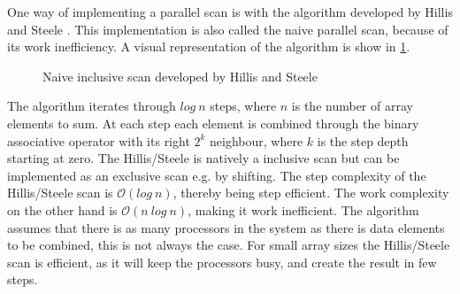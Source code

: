 One way of implementing a parallel scan is with the algorithm developed by Hillis and Steele \cite{Hillis:1986:DPA:7902.7903}. This implementation is also called the naive parallel scan, because of its work inefficiency. A visual representation of the algorithm is show in \cref{fig:scan_hillis_steele}. 

\begin{figure}[ht]
	\centering
	\caption{Naive inclusive scan developed by Hillis and Steele}
	\label{fig:scan_hillis_steele}
\end{figure}

The algorithm iterates through $log~n$ steps, where $n$ is the number of array elements to sum. At each step each element is combined through the binary associative operator with its right $ 2^k $ neighbour, where $k$ is the step depth starting at zero. The Hillis/Steele is natively a inclusive scan but can be implemented as an exclusive scan e.g. by shifting. The step complexity of the Hillis/Steele scan is $\mathcal{O}(log~n)$, thereby being step efficient. The work complexity on the other hand is $\mathcal{O}(n~ log~n)$, making it work inefficient. The algorithm assumes that there is as many processors in the system as there is data elements to be combined, this is not always the case. For small array sizes the Hillis/Steele scan is efficient, as it will keep the processors busy, and create the result in few steps. 